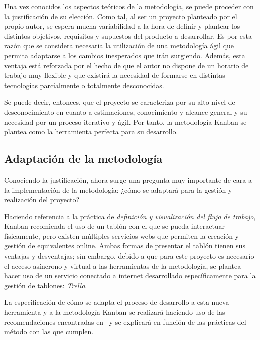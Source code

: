 Una vez conocidos los aspectos teóricos de la metodología, se puede proceder con
la justificación de su elección. Como tal, al ser un proyecto planteado por el
propio autor, se espera mucha variabilidad a la hora de definir y plantear los
distintos objetivos, requisitos y supuestos del producto a desarrollar. Es por
esta razón que se considera necesaria la utilización de una metodología ágil que
permita adaptarse a los cambios inesperados que irán surgiendo. Además, esta
ventaja está reforzada por el hecho de que el autor no dispone de un horario de
trabajo muy flexible y que existirá la necesidad de formarse en distintas
tecnologías parcialmente o totalmente desconocidas.

Se puede decir, entonces, que el proyecto se caracteriza por su alto nivel de
desconocimiento en cuanto a estimaciones, conocimiento y alcance general y su
necesidad por un proceso iterativo y ágil. Por tanto, la metodología Kanban se
plantea como la herramienta perfecta para su desarrollo.


\subsection{Adaptación de la metodología}\label{subsec:kanban_adaptacion}

Conociendo la justificación, ahora surge una pregunta muy importante de cara a
la implementación de la metodología: ¿cómo se adaptará para la gestión y
realización del proyecto?

Haciendo referencia a la práctica de \emph{definición y visualización del flujo
de trabajo}, Kanban recomienda el uso de un tablón con el que se pueda
interactuar físicamente, pero existen múltiples servicios webs que permiten la
creación y gestión de equivalentes online. Ambas formas de presentar el
tablón tienen sus ventajas y desventajas; sin embargo, debido a que para este proyecto es
necesario el acceso asíncrono y virtual a las herramientas de la metodología, se
plantea hacer uso de un servicio conectado a internet desarrollado
específicamente para la gestión de tablones: \emph{Trello}.

La especificación de cómo se adapta el proceso de desarrollo a esta nueva
herramienta y a la metodología Kanban se realizará haciendo uso de las
recomendaciones encontradas en~\cite{Brechner2015-dv} y se explicará en función
de las prácticas del método con las que cumplen.

